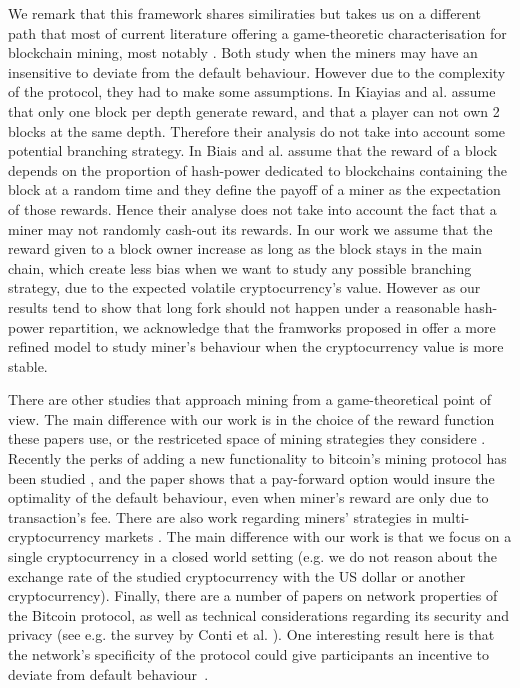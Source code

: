 \smallskip
{} We remark that this framework shares similiraties but takes us on a different path that most of current literature offering a game-theoretic characterisation for blockchain mining, most notably \cite{mininggames:2016,biais2018blockchain}.
Both study when the miners may have an insensitive to deviate from the default behaviour. However due to the complexity of the protocol, they had to make some assumptions. In \cite{} Kiayias and al. assume that only one block per depth generate reward, and that a player can not own 2 blocks at the same depth. Therefore their analysis do not take into account some potential branching strategy. In \cite{} Biais and al. assume that the reward of a block depends on the proportion of hash-power dedicated to blockchains containing the block at a random time and they define the payoff of a miner as the expectation of those rewards. Hence their analyse does not take into account the fact that a miner may not randomly cash-out its rewards. 
In our work we assume that the reward given to a block owner increase as long as the block stays in the main chain, which create less bias when we want to study any possible branching strategy, due to the expected volatile cryptocurrency's value. However as our results tend to show that long fork should not happen under a reasonable hash-power repartition, we acknowledge that the framworks proposed in \cite{mininggames:2016,biais2018blockchain} offer a more refined model to study miner's behaviour when the cryptocurrency value is more stable.  

There are other studies that approach mining from a game-theoretical point of view. The main difference with our work is in the choice of the reward function \cite{economics_of_mining2013,selfishmining2014,optimalselfishmining2017,biais2018blockchain,instabilitywithoutreward:2016} these papers use, or the restriceted space of mining strategies they considere  \cite{economics_of_mining2013,selfishmining2014,optimalselfishmining2017}. Recently the perks of adding a new functionality to bitcoin's mining protocol has been studied \cite{koutsoupias2018blockchain}, and the paper shows that a pay-forward option would insure the optimality of the default behaviour, even when miner's reward are only due to transaction's fee. 
There are also work regarding miners' strategies in multi-cryptocurrency markets \cite{dhamal2018stochastic,spiegelman2018game}. The main difference with our work is that we focus on a single cryptocurrency in a closed world setting (e.g. we do not reason about  the exchange rate of the studied cryptocurrency with the US dollar or another cryptocurrency). Finally, there are a number of papers on network properties of the Bitcoin protocol, as well as technical considerations regarding its security and privacy (see e.g. the survey by Conti et al. \cite{conti2018survey}). One interesting result here is that the network's specificity of the protocol could give participants an incentive to deviate from default behaviour~\cite{bitcoin_attacks_2013,ddos_attacks2014,empirical_dos_attacks2014}.  

